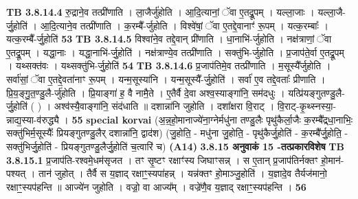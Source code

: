 \documentclass[17pt]{extarticle}
\begin{document}
{{{{{{{{{{{{{{{{{{{{{{                  \newline
                                \textbf{ TB 3.8.14.4} \newline
                  रु॒द्राने॒व तत्प्री॑णाति । ला॒जैर्जु॑होति । आ॒दि॒त्यानां॒ ॅवा ए॒तद्रू॒पम् । यल्ला॒जाः । यल्ला॒जै-र्जु॒होति॑ । आ॒दि॒त्याने॒व तत्प्री॑णाति । क॒रम्बै᳚-र्जुहोति । विश्वे॑षां॒ ॅवा ए॒तद्दे॒वानाꣳ॑ रू॒पम् । यत्क॒रम्बाः᳚ । यत्क॒रम्बै᳚-र्जु॒होति॑ \textbf{ 53} \newline
                  \newline
                                \textbf{ TB 3.8.14.5} \newline
                  विश्वा॑ने॒व तद्दे॒वान् प्री॑णाति । धा॒नाभि॑-र्जुहोति । नक्ष॑त्राणां॒ ॅवा ए॒तद्रू॒पम् । यद्धा॒नाः । यद्धा॒नाभि॑-र्जु॒होति॑ । नक्ष॑त्राण्ये॒व तत्प्री॑णाति । सक्तु॑भि-र्जुहोति । प्र॒जाप॑ते॒र्वा ए॒तद्रू॒पम् । यथ्सक्त॑वः । यथ्सक्तु॑भि-र्जु॒होति॑ \textbf{ 54} \newline
                  \newline
                                \textbf{ TB 3.8.14.6} \newline
                  प्र॒जाप॑तिमे॒व तत्प्री॑णाति । म॒सूस्यै᳚र्जुहोति । सर्वा॑सां॒ ॅवा ए॒तद्दे॒वता॑नाꣳ रू॒पम् । यन्म॒सूस्या॑नि । यन्म॒सूस्यै᳚-र्जु॒होति॑ । सर्वा॑ ए॒व तद्दे॒वताः᳚ प्रीणाति । प्रि॒य॒ङ्गु॒त॒ण्डु॒लै-र्जु॑होति । प्रि॒याङ्गा॑ ह॒ वै नामै॒ते । ए॒तैर्वै दे॒वा अश्व॒स्याङ्गा॑नि॒ सम॑दधुः । यत्प्रि॑यङ्गुतण्डु॒लै-र्जु॒होति॑ ( ) । अश्व॑स्यै॒वाङ्गा॑नि॒ संद॑धाति ॥ दशान्ना॑नि जुहोति । दशा᳚क्षरा वि॒राट् । वि॒राट्-कृ॒थ्स्नस्या॒-न्नाद्य॒स्या-व॑रुद्ध्यै । \textbf{ 55} \newline
                  \newline
                                                        \textbf{special korvai} \newline
              (अ॒न्न॒हो॒मानाज्ये॑ना॒ग्नेर्मधु॑ना तण्डु॒लैः पृथु॑कैर्ला॒जैः क॒रम्बै᳚द्र्धा॒नाभिः॒ सक्तु॑भिर्म॒सूस्यैः᳚ प्रियङ्गुतण्डु॒लैर् दशान्ना॑नि॒ द्वाद॑श) \newline
                                (जु॒होति॒ - मधु॑ना जु॒होति॒ - पृथु॑कैर्जु॒होति॑ - क॒रम्बै᳚र्जु॒होति॒ - सक्तु॑भिर्जु॒होति॑ - प्रियङ्गुतण्डु॒लैर्जु॒होति॑ च॒त्वारि॑ च) \textbf{(A14)} \newline \newline
                \textbf{ 3.8.15    अनुवाकं   15 -तत्प्रकारविशेष} \newline
                                \textbf{ TB 3.8.15.1} \newline
                  प्र॒जाप॑ति-रश्वमे॒धम॑सृजत । तꣳ सृ॒ष्टꣳ रक्षाꣳ॑स्य जिघाꣳसन्न् । स ए॒तान् प्र॒जाप॑तिर्नक्तꣳ हो॒मान॑-पश्यत् । तान॑ जुहोत् । तैर्वै स य॒ज्ञाद् रक्षाꣳ॒॒स्यपा॑हन्न् । यन्न॑क्तꣳ हो॒माञ्जु॒होति॑ । य॒ज्ञादे॒व तैर्यज॑मानो॒ रक्षाꣳ॒॒स्यप॑हन्ति ॥ आज्ये॑न जुहोति । वज्रो॒ वा आज्य᳚म् । वज्रे॑णै॒व य॒ज्ञाद् रक्षाꣳ॒॒स्यप॑हन्ति । \textbf{ 56} \newline
}}}}}}}}}}}}}}}}}}}}}}
\end{document}
